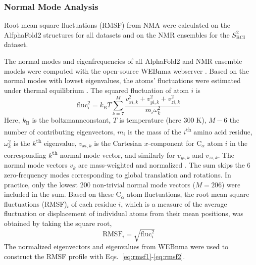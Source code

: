 \subsubsection{Normal Mode Analysis}\label{sec:nma}


Root mean square fluctuations (RMSF) from NMA were calculated on the AlfphaFold2 structures for all datasets and on the NMR ensembles for the $S^{2}_{\text{RCI}}$ dataset.

The normal modes and eigenfrequencies of all AlphaFold2 and NMR ensemble models were computed with the open-source WEBnma webserver \cite{hollup2005webnm,tiwari2014webnm}. Based on the normal modes with lowest eigenvalues, the atoms’ fluctuations were estimated under thermal equilibrium \cite{ghysels2012comparing}. The squared fluctuation of atom $i$ is
\begin{equation}
\mathrm{fluc}_i^2 = k_{\text{B}}T \sum_{k=7}^{M} \frac{v_{xi,k}^2 + v_{yi,k}^2 + v_{zi,k}^2}{m_i \omega_k^2}
\label{eq:rmsf1}
\end{equation}
Here, $k_{\text{B}}$ is the \gls{boltzmannconstant}, $T$ is temperature (here 300 K), $M-6$ the number of contributing eigenvectors, $m_i$ is the mass of the $i$\textsuperscript{th} amino acid residue, $\omega_k^2$ is the $k$\textsuperscript{th} eigenvalue, $v_{xi,k}$ is the Cartesian $x$-component for C$_\alpha$ atom $i$ in the corresponding $k$\textsuperscript{th} normal mode vector, and similarly for $v_{yi,k}$ and $v_{zi,k}$. The normal mode vectors $v_k$ are mass-weighted and normalized \cite{ghysels2012comparing}. The sum skips the 6 zero-frequency modes corresponding to global translation and rotations. In practice, only the lowest 200 non-trivial normal mode vectors ($M=206$) were included in the sum.
Based on these C$_\alpha$ atom fluctuations, the root mean square fluctuations (RMSF)$_i$ of each residue $i$, which is a measure of the average fluctuation or displacement of individual atoms from their mean positions, was obtained by taking the square root,
\begin{equation}
{\text{RMSF}}_i = \sqrt{\mathrm{fluc}_i^2}
\label{eq:rmsf2}
\end{equation}
The normalized eigenvectors and eigenvalues from WEBnma were used to construct the RMSF profile with Eqs.~\ref{eq:rmsf1}-\ref{eq:rmsf2}. 

